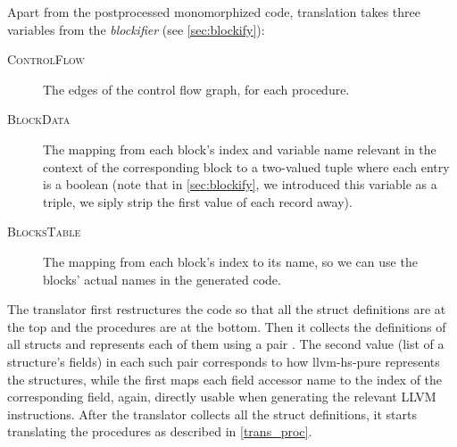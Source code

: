 Apart from the postprocessed monomorphized code, translation takes three variables from the \emph{blockifier} (see \cref{sec:blockify}):

\begin{description}
    \item[\textsc{ControlFlow}] The edges of the control flow graph, for each procedure.
    \item[\textsc{BlockData}] The mapping from each block's index and variable name relevant in the context of the corresponding block to a two-valued tuple \linebreak {} where each entry is a boolean (note that in \cref{sec:blockify}, we introduced this variable as a triple, we siply strip the first value of each record away).
    \item[\textsc{BlocksTable}] The mapping from each block's index to its name, so we can use the blocks' actual names in the generated code.
\end{description}

\sloppy The translator first restructures the code so that all the struct definitions are at the top and the procedures are at the bottom. Then it collects the definitions of all structs and represents each of them using a pair  . The second value (list of a structure's fields) in each such pair corresponds to how llvm-hs-pure represents the structures, while the first maps each field accessor name to the index of the corresponding field, again, directly usable when generating the relevant LLVM instructions. After the translator collects all the struct definitions, it starts translating the procedures as described in \cref{trans_proc}.

